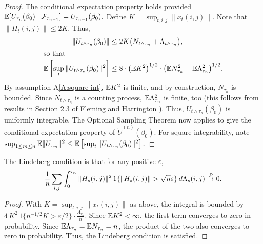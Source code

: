 \documentclass[aoas,preprint]{imsart}
\begin{document}
\begin{proof}
The conditional expectation property holds provided
\(
    \mathbb{E}[ U_{\tau_{n}}(\beta_0) \mid \mathcal{F}_{\tau_{n-1}} ]
        = U_{\tau_{n-1}}(\beta_0).
\)
Define $K = \sup_{t,i,j} \| x_{t}(i,j) \|$.
Note that $\|H_{t}(i,j)\| \leq 2 K$.  Thus,
\begin{align*}
    \| U_{t \wedge \tau_n} (\beta_0) \|
        &\leq
            2 K
            \big(
                N_{t \wedge \tau_n}
                +
                \Lambda_{t \wedge \tau_n}
            \big), \\
\intertext{so that}
    \E \left[
        \sup_t
        \| U_{t \wedge \tau_n} (\beta_0) \|^2
    \right]
        &\leq
            8 \cdot \big(\E K^2\big)^{1/2} \cdot
            \big(
              \E N_{\tau_n}^2
              +
              \E \Lambda_{\tau_n}^2
            \big)^{1/2}.
\end{align*}
By assumption A\ref{A:square-int}, $\mathbb{E} K^2$ is finite, and by construction,
$N_{\tau_n}$ is bounded.  Since $N_{t \wedge \tau_n}$ is a counting process,
$\mathbb{E} \Lambda_{\tau_n}^2$ is finite, too
(this follows from results in Section 2.3 of Fleming and Harrington
\cite{fleming1991counting}).  Thus, $U_{t \wedge \tau_n}(\beta_0)$
is uniformly integrable.  The Optional Sampling Theorem now applies to
give the conditional expectation property of $\tilde U^{(n)}(\beta_0)$.  For
square integrability, note
\(
    \sup_{1 \leq m \leq n}
    \mathbb{E} \| U_{\tau_m} \|^2
        \leq
        \mathbb{E} \left[
           \sup_t
           \| U_{t \wedge \tau_n} (\beta_0) \|^2
        \right].
\)
\end{proof}

\begin{lemma}\label{L:Lindeberg-condition}
The Lindeberg condition is that for any positive $\varepsilon$,
\[
    \frac{1}{n}
    \sum_{i,j}
    \int_{0}^{\tau_n}
        \| H_s(i,j) \|^2
        \, 1\{\| H_s(i,j) \| > \sqrt{n} \varepsilon \}
        \, d\Lambda_s(i,j)
        \overset{\mathit{P}}{\to}
        0.
\]
\end{lemma}

\begin{proof}
With $K = \sup_{t,i,j} \| x_t(i,j)\|$ as above, the integral is bounded by
\(
    4 \, K^2 \, 1\{n^{-1/2} K > \varepsilon / 2\}
    \cdot
    \frac{\Lambda_{\tau_n}}{n}.
\)
Since $\mathbb{E} K^2 < \infty$, the first term converges to zero in probability.
Since $\mathbb{E} \Lambda_{\tau_n} = \mathbb{E} N_{\tau_n} = n$, the product of the two also
converges to zero in probability.  Thus, the Lindeberg condition is satisfied.
\end{proof}
\end{document}
